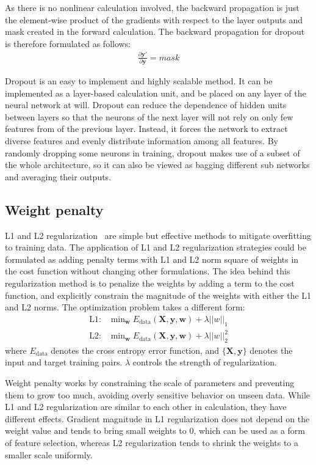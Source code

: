 \documentclass{article}
\begin{document}
As there is no nonlinear calculation involved, the backward propagation is just the element-wise product of the gradients with respect to the layer outputs and mask created in the forward calculation. 
The backward propagation for dropout is therefore formulated as follows:
\begin{align}
    \frac{\partial \bm{y}'}{\partial \bm{y}} = mask
\end{align}

Dropout is an easy to implement and highly scalable method. 
It can be implemented as a layer-based calculation unit, and be placed on any layer of the neural network at will. 
Dropout can reduce the dependence of hidden units between layers so that the neurons of the next layer will not rely on only few features from of the previous layer.
Instead, it forces the network to extract diverse features and evenly distribute information among all features. 
By randomly dropping some neurons in training, dropout makes use of a subset of the whole architecture, so it can also be viewed as bagging different sub networks and averaging their outputs.


\subsection{Weight penalty}

L1 and L2 regularization~\cite{ng2004feature} are simple but effective methods to mitigate overfitting to training data. 
The application of L1 and L2 regularization strategies could be formulated as adding penalty terms with L1 and L2 norm square of weights in the cost function without changing other formulations. 
The idea behind this regularization method is to penalize the weights by adding a term to the cost function, and explicitly constrain the magnitude of the weights with either the L1 and L2 norms.
The optimization problem takes a different form:
\begin{align}
    \text{L1: } & \text{min}_{\bm{w}} \; E_{\text{data}}(\bm{X}, \bm{y}, \bm{w}) + \lambda ||w||_1\\
    \text{L2: } & \text{min}_{\bm{w}} \; E_{\text{data}}(\bm{X}, \bm{y}, \bm{w}) + \lambda ||w||^2_2
\end{align}
where $E_{\text{data}}$ denotes the cross entropy error function, and $\{\bm{X}, \bm{y}\}$ denotes the input and target training pairs. 
$\lambda$ controls the strength of regularization.

Weight penalty works by constraining the scale of parameters and preventing them to grow too much, avoiding overly sensitive behavior on unseen data.
While L1 and L2 regularization are similar to each other in calculation, they have different effects.
Gradient magnitude in L1 regularization does not depend on the weight value and tends to bring small weights to 0, which can be used as a form of feature selection, whereas L2 regularization tends to shrink the weights to a smaller scale uniformly. 
\end{document}

